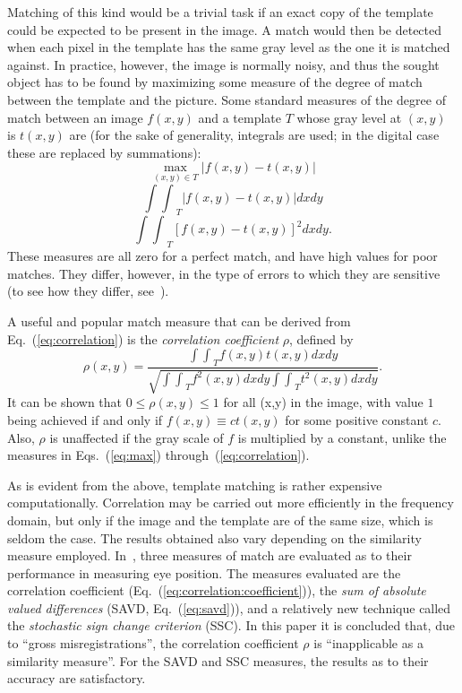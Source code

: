 Matching of this kind would be a trivial task if an exact copy of the
template could be expected to be present in the image.  A match would
then be detected when each pixel in the template has the same gray
level as the one it is matched against.  In practice, however, the
image is normally noisy, and thus the sought object has to be found by
maximizing some measure of the degree of match between the template
and the picture.  Some standard measures of the degree of match
between an image $f(x,y)$ and a template $T$ whose gray level at
$(x,y)$ is $t(x,y)$ are (for the sake of generality, integrals are
used; in the digital case these are replaced by summations):
\begin{equation}
\label{eq:max}
  \max_{(x,y)\in T}|f(x,y)-t(x,y)|
\end{equation}
\begin{equation}
\label{eq:savd}
  {\int\int}_{T}|f(x,y)-t(x,y)|dxdy
\end{equation}
\begin{equation}
\label{eq:correlation}
  {\int\int}_{T}[f(x,y)-t(x,y)]^{2}dxdy\mbox{.}
\end{equation}
These measures are all zero for a perfect match, and have high values
for poor matches.  They differ, however, in the type of errors to
which they are sensitive (to see how they differ, see~\cite{digpat}).

A useful and popular match measure that can be derived from
Eq.~(\ref{eq:correlation}) is the {\em correlation coefficient\/}
$\rho$, defined by
\begin{equation}
\label{eq:correlation:coefficient}
  \rho(x,y)=\frac{{\int\int}_{T}f(x,y)t(x,y)dxdy}
  {\sqrt{{\int\int}_{T}f^{2}(x,y)dxdy{\int\int}_{T}t^{2}(x,y)dxdy}}\mbox{.}
\end{equation}
It can be shown that $0\leq \rho(x,y)\leq 1$ for all (x,y) in the
image, with value $1$ being achieved if and only if $f(x,y)\equiv
ct(x,y)$ for some positive constant $c$.  Also, $\rho$ is unaffected
if the gray scale of $f$ is multiplied by a constant, unlike the
measures in Eqs.~(\ref{eq:max}) through~(\ref{eq:correlation}).

As is evident from the above, template matching is rather expensive
computationally.  Correlation may be carried out more efficiently in
the frequency domain, but only if the image and the template are of
the same size, which is seldom the case.  The results obtained also
vary depending on the similarity measure employed.
In~\cite{template}, three measures of match are evaluated as to their
performance in measuring eye position.  The measures evaluated are the
correlation coefficient (Eq.~(\ref{eq:correlation:coefficient})), the
{\em sum of absolute valued differences\/} (SAVD,
Eq.~(\ref{eq:savd})), and a relatively new technique called the {\em
  stochastic sign change criterion\/} (SSC).  In this paper it is
concluded that, due to ``gross misregistrations'', the correlation
coefficient $\rho$ is ``inapplicable as a similarity measure''.  For
the SAVD and SSC measures, the results as to their accuracy are
satisfactory.
